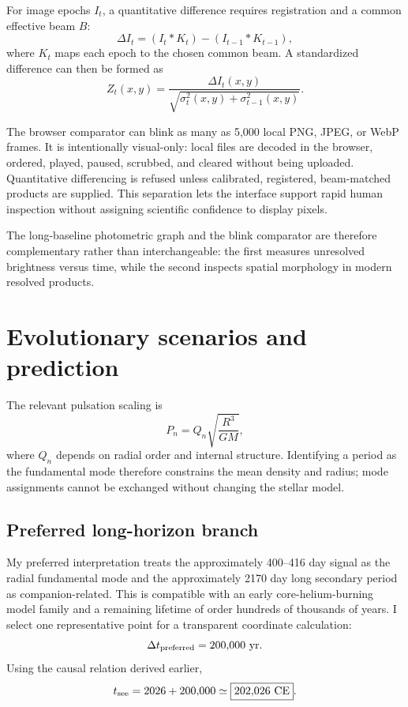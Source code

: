 \documentclass[11pt,a4paper]{article}
\begin{document}
For image epochs $I_t$, a quantitative difference requires registration and a common effective beam $B$:
\begin{equation}
\Delta I_t=(I_t\ast K_t)-(I_{t-1}\ast K_{t-1}),
\end{equation}
where $K_t$ maps each epoch to the chosen common beam. A standardized difference can then be formed as
\begin{equation}
Z_t(x,y)=\frac{\Delta I_t(x,y)}
{\sqrt{\sigma_t^2(x,y)+\sigma_{t-1}^2(x,y)}}.
\end{equation}

The browser comparator can blink as many as 5,000 local PNG, JPEG, or WebP frames. It is intentionally visual-only: local files are decoded in the browser, ordered, played, paused, scrubbed, and cleared without being uploaded. Quantitative differencing is refused unless calibrated, registered, beam-matched products are supplied. This separation lets the interface support rapid human inspection without assigning scientific confidence to display pixels.

The long-baseline photometric graph and the blink comparator are therefore
complementary rather than interchangeable: the first measures unresolved
brightness versus time, while the second inspects spatial morphology in modern
resolved products.

\section{Evolutionary scenarios and prediction}

The relevant pulsation scaling is
\begin{equation}
P_n=Q_n\sqrt{\frac{R^3}{GM}},
\end{equation}
where $Q_n$ depends on radial order and internal structure. Identifying a period as the fundamental mode therefore constrains the mean density and radius; mode assignments cannot be exchanged without changing the stellar model.

\subsection{Preferred long-horizon branch}

My preferred interpretation treats the approximately 400--416 day signal as the radial fundamental mode and the approximately 2170 day long secondary period as companion-related. This is compatible with an early core-helium-burning model family and a remaining lifetime of order hundreds of thousands of years. I select one representative point for a transparent coordinate calculation:
\begin{equation}
\Delta t_{\rm preferred}=200{,}000\ \mathrm{yr}.
\end{equation}
Using the causal relation derived earlier,
\begin{equation}
t_{\rm see}=2026+200{,}000\simeq\boxed{202{,}026\ \mathrm{CE}}.
\end{equation}
\end{document}
